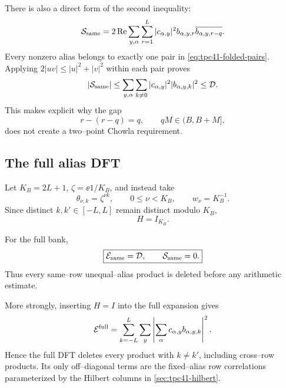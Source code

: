 There is also a direct form of the second inequality:
\begin{equation}
 \mathcal S_{\rm same}
 =2\operatorname{Re}
 \sum_{y,\alpha}\sum_{r=1}^{L}
 |c_{\alpha,y}|^2
 b_{\alpha,y,r}\overline{b_{\alpha,y,r-q}}.
 \label{eq:tpc41-minimal-direct-S}
\end{equation}
Every nonzero alias belongs to exactly one pair in
\eqref{eq:tpc41-folded-pairs}.  Applying
\(2|uv|\le|u|^2+|v|^2\) within each pair proves
\begin{equation}
 |\mathcal S_{\rm same}|
 \le\sum_{y,\alpha}\sum_{k\ne0}
 |c_{\alpha,y}|^2|b_{\alpha,y,k}|^2
 \le\mathcal D.
 \label{eq:tpc41-minimal-direct-bound}
\end{equation}
This makes explicit why the gap
\begin{equation}
 r-(r-q)=q,
 \qquad qM\in(B,B+M],
 \label{eq:tpc41-long-gap}
\end{equation}
does not create a two--point Chowla requirement.

\subsection{The full alias DFT}

Let \(K_B=2L+1\), \(\zeta=\ee{1/K_B}\), and instead take
\begin{equation}
 \theta_{\nu,k}=\zeta^{\nu k},
 \qquad0\le\nu<K_B,
 \qquad w_\nu=K_B^{-1}.
 \label{eq:tpc41-full-bank}
\end{equation}
Since distinct \(k,k'\in[-L,L]\) remain distinct modulo \(K_B\),
\begin{equation}
 H=I_{K_B}.
 \label{eq:tpc41-full-H}
\end{equation}

\begin{corollary}
\label{cor:tpc41-full-deletion}
For the full bank,
\begin{equation}
 \boxed{
 \mathcal E_{\rm same}=\mathcal D,
 \qquad \mathcal S_{\rm same}=0.}
 \label{eq:tpc41-full-deletion}
\end{equation}
Thus every same--row unequal--alias product is deleted before any
arithmetic estimate.
\end{corollary}

More strongly, inserting \(H=I\) into the full expansion gives
\begin{equation}
 \mathcal E^{\rm full}
 =\sum_{k=-L}^{L}\sum_y
  \left|\sum_\alpha c_{\alpha,y}b_{\alpha,y,k}\right|^2.
 \label{eq:tpc41-full-fixed-alias-energy}
\end{equation}
Hence the full DFT deletes every product with \(k\ne k'\), including
cross--row products.  Its only off--diagonal terms are the fixed--alias
row correlations parameterized by the Hilbert columns in
\cref{sec:tpc41-hilbert}.

